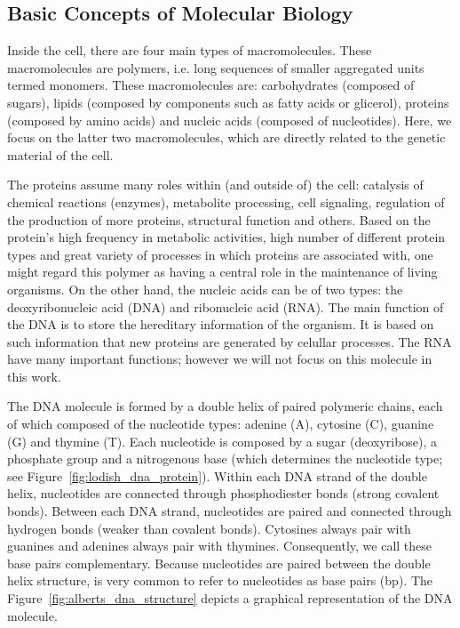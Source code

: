 \subsection{Basic Concepts of Molecular Biology}
\label{sec:basic.concepts.molecular.biology}


Inside the cell, there are four main types of macromolecules. These macromolecules are polymers, i.e. long sequences of smaller aggregated units termed monomers. These macromolecules are: carbohydrates (composed of sugars), lipids (composed by components such as fatty acids or glicerol), proteins (composed by amino acids) and nucleic acids (composed of nucleotides). Here, we focus on the latter two macromolecules, which are directly related to the genetic material of the cell.

The proteins assume many roles within (and outside of) the cell: catalysis of chemical reactions (enzymes), metabolite processing, cell signaling, regulation of the production of more proteins, structural function and others. Based on the protein's high frequency in metabolic activities, high number of different protein types and great variety of processes in which proteins are associated with, one might regard this polymer as having a central role in the maintenance of living organisms. On the other hand, the nucleic acids can be of two types: the deoxyribonucleic acid (DNA) and ribonucleic acid (RNA). The main function of the DNA is to store the hereditary information of the organism. It is based on such information that new proteins are generated by celullar processes. The RNA have many important functions; however we will not focus on this molecule in this work.

The DNA molecule is formed by a double helix of paired polymeric chains, each of which composed of the nucleotide types: adenine (A), cytosine (C), guanine (G) and thymine (T). Each nucleotide is composed by a sugar (deoxyribose), a phosphate group and a nitrogenous base (which determines the nucleotide type; see Figure~\ref{fig:lodish_dna_protein}). Within each DNA strand of the double helix, nucleotides are connected through phosphodiester bonds (strong covalent bonds). Between each DNA strand, nucleotides are paired and connected through hydrogen bonds (weaker than covalent bonds). Cytosines always pair with guanines and adenines always pair with thymines. Consequently, we call these base pairs complementary. Because nucleotides are paired between the double helix structure, is very common to refer to nucleotides as base pairs (bp). The Figure~\ref{fig:alberts_dna_structure} depicts a graphical representation of the DNA molecule.

